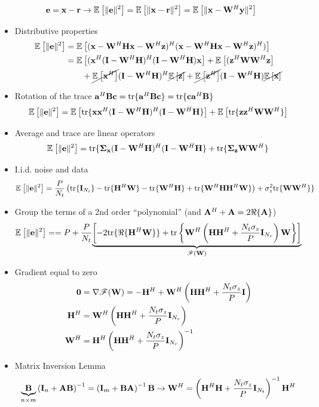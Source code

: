 \documentclass[xcolor=dvipsnames,aspectratio=169]{beamer}
\begin{document}
{    \vspace{-.1in}
    \begin{definition}
     $$\e=\x-\rr\to\Ex{}{\|\e\|^2}=\Ex{}{\|\x-\rr\|^2}=\Ex{}{\|\x-\W^H\y\|^2}$$
    \end{definition}
    \begin{itemize}
     \item Distributive properties
     \begin{equation*}
        \begin{split}
        \Ex{}{\|\e\|^2}&=\Ex{}{(\x-\W^H\Hb\x-\W^H\z)^H(\x-\W^H\Hb\x-\W^H\z)^H)}\\
                        &=\Ex{}{(\x^H(\I-\W^H\Hb)^H(\I-\W^H\Hb)\x}+\Ex{}{(\z^H\W\W^H\z}\\
                        &\qquad+\cancel{\Ex{}{\x^H}}(\I-\W^H\Hb)^H\cancel{\Ex{}{\z}}+\cancel{\Ex{}{\z^H}}(\I-\W^H\Hb)\cancel{\Ex{}{\x}}\\
        \end{split}
     \end{equation*}
     \item Rotation of the trace $\ab^H\B\cc=\tr\{\ab^H\B\cc\}=\tr\{\cc\ab^H\B\}$
     $$\Ex{}{\|\e\|^2}=\Ex{}{\tr\{\x\x^H(\I-\W^H\Hb)^H(\I-\W^H\Hb\}}+\Ex{}{\tr\{\z\z^H\W\W^H\}}$$
     \item Average and trace are linear operators
     $$\Ex{}{\|\e\|^2}=\tr\{\Sg_{\x}(\I-\W^H\Hb)^H(\I-\W^H\Hb\}+\tr\{\Sg_{\z}\W\W^H\}$$
     \item I.i.d. noise and data 
     $$\Ex{}{\|\e\|^2}=\frac{P}{N_t}\left(\tr\{\I_{N_t}\}-\tr\{\Hb^H\W\}-\tr\{\W^H\Hb\}+\tr\{\W^H\Hb\Hb^H\W\}\right)+\sigma_z^2\tr\{\W\W^H\}\}$$
     \item Group the terms of a 2nd order ``polynomial'' (and $\A^H+\A=2\Re\{\A\}$)
     $$\Ex{}{\|\e\|^2}==P+\frac{P}{N_t}\underset{\mathscr{F}(\W)}{\underbrace{\left[-2\tr\{\Re\{\Hb^H\W\}\}+\tr\left\{\W^H\left(\Hb\Hb^H+\frac{N_t\sigma_z}{P}\I_{N_{r}}\right)\W\right\}\right]}}$$
     \item Gradient equal to zero
       \begin{equation*}
        \begin{split}
        \zero &= \nabla \mathscr{F}(\W) =-\Hb^H+\W^H\left(\Hb\Hb^H+\frac{N_t\sigma_z}{P}\I\right)\\
                        \Hb^H&=\W^H\left(\Hb\Hb^H+\frac{N_t\sigma_z}{P}\I_{N_{r}}\right)\\
                        \W^H&=\Hb^H\left(\Hb\Hb^H+\frac{N_t\sigma_z}{P}\I_{N_{r}}\right)^{-1}\\
        \end{split}
        \end{equation*}
     \item Matrix Inversion Lemma
     $$\underset{n\times m}{\underbrace{\B}}\left(\I_{n}+\A\B\right)^{-1}=\left(\I_{m}+\B\A\right)^{-1}\B\to \W^H=\left(\Hb^H\Hb+\frac{N_t\sigma_z}{P}\I_{N_t}\right)^{-1}\Hb^H$$
    \end{itemize}
    
}
\end{document}
